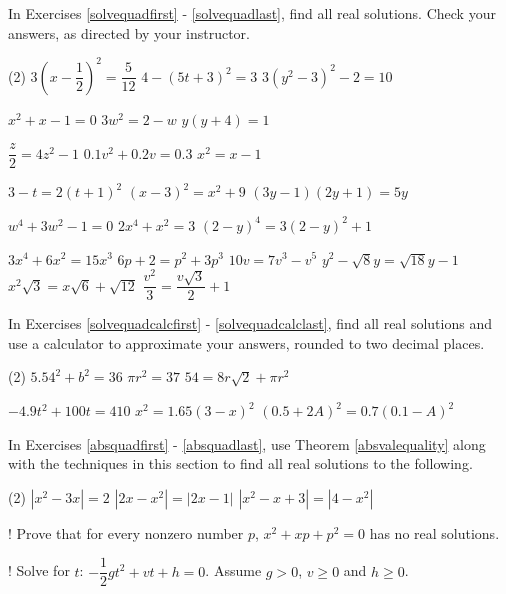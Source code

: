 \label{ExercisesforAppQuadEqus}

In Exercises \ref{solvequadfirst} - \ref{solvequadlast}, find all real solutions.  Check your answers, as directed by your instructor.

\begin{tasks}(2)
\task  $3\left(x - \dfrac{1}{2}\right)^2 = \dfrac{5}{12}$ \label{solvequadfirst}
\task  $4 - (5t+3)^2 = 3$ 
\task  $3(y^2-3)^2-2 = 10$ 

\task $x^2 + x - 1 = 0$
\task $3w^2 = 2-w$
\task $y(y+4) = 1$

\task $\dfrac{z}{2} = 4z^2-1$
\task  $0.1v^2 + 0.2v = 0.3$ 
\task $x^2 = x - 1$

\task $3-t = 2(t+1)^2$
\task $(x-3)^2 = x^2+9$
\task $(3y-1)(2y+1) = 5y$

\task $w^4 + 3w^2 - 1 = 0$
\task $2x^4 +x^2 = 3$ 
\task $(2-y)^4 = 3(2-y)^2 + 1$

\task $3x^4 + 6x^2 = 15x^3$
\task $6p + 2 = p^2 + 3p^3$
\task $10v = 7v^3 - v^5$
\task $y^2 - \sqrt{8} y = \sqrt{18} y - 1$
\task $x^2 \sqrt{3} = x \sqrt{6} + \sqrt{12}$
\task $\dfrac{v^2}{3} = \dfrac{v \sqrt{3}}{2} + 1$ \label{solvequadlast}

\end{tasks}

In Exercises \ref{solvequadcalcfirst} - \ref{solvequadcalclast}, find all real solutions and use a calculator to approximate your answers, rounded to two decimal places.

\begin{tasks}[resume](2)
\task $5.54^2 + b^2 = 36$\label{solvequadcalcfirst}
\task $\pi r^2 = 37$ 
\task $54 = 8r\sqrt{2} + \pi r^2$

\task $-4.9t^2 + 100t = 410$
\task $x^2 = 1.65(3-x)^2$
\task $(0.5+2A)^2 = 0.7(0.1-A)^2$ \label{solvequadcalclast}

\end{tasks}

In Exercises \ref{absquadfirst} - \ref{absquadlast}, use Theorem \ref{absvalequality} along with the techniques in this section to find all real solutions to the following.

\begin{tasks}[resume](2)
\task $|x^2 - 3x| = 2$ \label{absquadfirst}
\task $|2x-x^2| = |2x-1|$
\task $|x^2 -x + 3| = |4-x^2|$ \label{absquadlast}

\task!  Prove that for every nonzero number $p$, $x^2 + xp + p^2 = 0$  has no real solutions.

\task!  Solve for $t$: $-\dfrac{1}{2} g t^2 + vt + h = 0$. Assume $g > 0$, $v \geq 0$ and $h \geq 0$.

\end{tasks}

